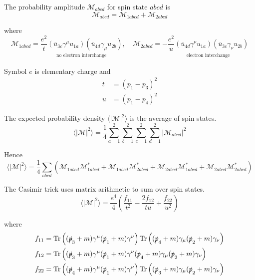 The probability amplitude $\mathcal M_{abcd}$ for spin state $abcd$ is
\begin{equation*}
\mathcal M_{abcd}=\mathcal M_{1abcd}+\mathcal M_{2abcd}
\end{equation*}

where
\begin{equation*}
\mathcal M_{1abcd}=\underset{\substack{\text{no electron interchange}}}
{\frac{e^2}{t}(\bar{u}_{3c}\gamma^\mu u_{1a})(\bar{u}_{4d}\gamma_\mu u_{2b})},
\quad
\mathcal M_{2abcd}=-\underset{\substack{\text{electron interchange}}}
{\frac{e^2}{u}(\bar{u}_{4d}\gamma^\nu u_{1a})(\bar{u}_{3c}\gamma_\nu u_{2b})}
\end{equation*}

Symbol $e$ is elementary charge and
\begin{align*}
t&=(p_1-p_3)^2
\\
u&=(p_1-p_4)^2
\end{align*}

The expected probability density $\langle|\mathcal M|^2\rangle$
is the average of spin states.
\begin{equation*}
\langle|\mathcal M|^2\rangle=\frac{1}{4}
\sum_{a=1}^2\sum_{b=1}^2\sum_{c=1}^2\sum_{d=1}^2
|\mathcal M_{abcd}|^2
\end{equation*}

Hence
\begin{equation*}
\langle|\mathcal{M}|^2\rangle=\frac{1}{4}
\sum_{abcd}
\left(
\mathcal M_{1abcd}\mathcal M_{1abcd}^*
+\mathcal M_{1abcd}\mathcal M_{2abcd}^*
+\mathcal M_{2abcd}\mathcal M_{1abcd}^*
+\mathcal M_{2abcd}\mathcal M_{2abcd}^*
\right)
\end{equation*}






The Casimir trick uses matrix arithmetic to sum over spin states.
\begin{equation*}
\langle|\mathcal{M}|^2\rangle
=\frac{e^4}{4}
\left(
\frac{f_{11}}{t^2}-\frac{2f_{12}}{tu}+\frac{f_{22}}{u^2}
\right)
\end{equation*}

where
\begin{align*}
f_{11}&=
\operatorname{Tr}\left(
(\slashed p_3+m)\gamma^\mu(\slashed p_1+m)\gamma^\nu
\right)
\operatorname{Tr}\left(
(\slashed p_4+m)\gamma_\mu(\slashed p_2+m)\gamma_\nu
\right)
\\
f_{12}&=
\operatorname{Tr}\left(
(\slashed p_3+m)\gamma^\mu(\slashed p_1+m)\gamma^\nu
(\slashed p_4+m)\gamma_\mu(\slashed p_2+m)\gamma_\nu
\right)
\\
f_{22}&=
\operatorname{Tr}\left(
(\slashed p_4+m)\gamma^\mu(\slashed p_1+m)\gamma^\nu
\right)
\operatorname{Tr}\left(
(\slashed p_3+m)\gamma_\mu(\slashed p_2+m)\gamma_\nu
\right)
\end{align*}

